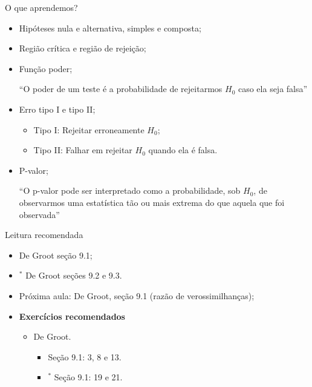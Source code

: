 \begin{frame}{O que aprendemos?}
\begin{itemize}

  \item[\faLightbulbO] Hipóteses nula e alternativa, simples e composta;    
  \item[\faLightbulbO] Região crítica e região de rejeição;
  \item[\faLightbulbO] Função poder;
  
  ``O poder de um teste é a probabilidade de rejeitarmos $H_0$ caso ela seja falsa''
  
  \item[\faLightbulbO] Erro tipo I e tipo II;
  \begin{itemize}
   \item Tipo I: Rejeitar erroneamente $H_0$;
   \item Tipo II: Falhar em rejeitar $H_0$ quando ela é falsa.
  \end{itemize}
  \item[\faLightbulbO] P-valor;
  
  ``O p-valor pode ser interpretado como a probabilidade, sob $H_0$, de observarmos uma estatística tão ou mais extrema do que aquela que foi observada''
  \end{itemize}
 \end{frame}

\begin{frame}{Leitura recomendada}
\begin{itemize}
 \item[\faBook] De Groot seção 9.1;
 \item[\faBook] $^\ast$ De Groot seções 9.2 e 9.3.
 \item[\faForward] Próxima aula: De Groot, seção 9.1 (razão de verossimilhanças);
 \item {\large\textbf{Exercícios recomendados}}
 \begin{itemize}
  \item[\faBookmark] De Groot.
  \begin{itemize}
   \item Seção 9.1: 3, 8 e 13.
   \item $^\ast$ Seção 9.1: 19 e 21.
  \end{itemize}   
  \end{itemize}
 \end{itemize} 
\end{frame}
